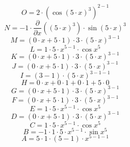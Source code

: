 \documentclass[12pt]{article}
\begin{document}
\begin{equation}
	O = 
2\cdot \left( \cos {\left( 5\cdot x\right) ^{3}}\right) ^{2 - 1}
\end{equation}
\begin{equation}
	N = 
-1\cdot \frac{\partial}{\partial x}\left( \left( 5\cdot x\right) ^{3}\right) \cdot \sin {\left( 5\cdot x\right) ^{3}}
\end{equation}
\begin{equation}
	M = 
\left( 0\cdot x + 5\cdot 1\right) \cdot 3\cdot \left( 5\cdot x\right) ^{3 - 1}
\end{equation}
\begin{equation}
	L = 
1\cdot 5\cdot x^{5 - 1}\cdot \cos {x^{5}}
\end{equation}
\begin{equation}
	K = 
\left( 0\cdot x + 5\cdot 1\right) \cdot 3\cdot \left( 5\cdot x\right) ^{3 - 1}
\end{equation}
\begin{equation}
	J = 
\left( 0\cdot x + 5\cdot 1\right) \cdot 3\cdot \left( 5\cdot x\right) ^{3 - 1}
\end{equation}
\begin{equation}
	I = 
\left( 3 - 1\right) \cdot \left( 5\cdot x\right) ^{3 - 1 - 1}
\end{equation}
\begin{equation}
	H = 
0\cdot x + 0\cdot 1 + 0\cdot 1 + 5\cdot 0
\end{equation}
\begin{equation}
	G = 
\left( 0\cdot x + 5\cdot 1\right) \cdot 3\cdot \left( 5\cdot x\right) ^{3 - 1}
\end{equation}
\begin{equation}
	F = 
\left( 0\cdot x + 5\cdot 1\right) \cdot 3\cdot \left( 5\cdot x\right) ^{3 - 1}
\end{equation}
\begin{equation}
	E = 
1\cdot 5\cdot x^{5 - 1}\cdot \cos {x^{5}}
\end{equation}
\begin{equation}
	D = 
\left( 0\cdot x + 5\cdot 1\right) \cdot 3\cdot \left( 5\cdot x\right) ^{3 - 1}
\end{equation}
\begin{equation}
	C = 
1\cdot 5\cdot x^{5 - 1}\cdot \cos {x^{5}}
\end{equation}
\begin{equation}
	B = 
-1\cdot 1\cdot 5\cdot x^{5 - 1}\cdot \sin {x^{5}}
\end{equation}
\begin{equation}
	A = 
5\cdot 1\cdot \left( 5 - 1\right) \cdot x^{5 - 1 - 1}
\end{equation}
\end{document}
